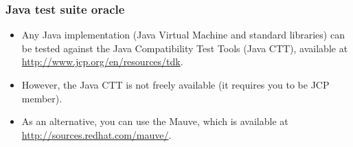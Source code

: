 \begin{frame}[hasprev=false, hasnext=false]
\label{example:java-test-suite-oracle}
\frametitle{Java test suite oracle}

\begin{itemize}
	\item Any Java implementation (Java Virtual Machine and standard libraries)
	can be tested against the Java Compatibility Test Tools (Java CTT),
	available at \url{http://www.jcp.org/en/resources/tdk}.

	\item However, the Java CTT is not freely available (it requires you to be
	JCP member).

	\item As an alternative, you can use the Mauve, which is available at
	\url{http://sources.redhat.com/mauve/}.
\end{itemize}
\end{frame}